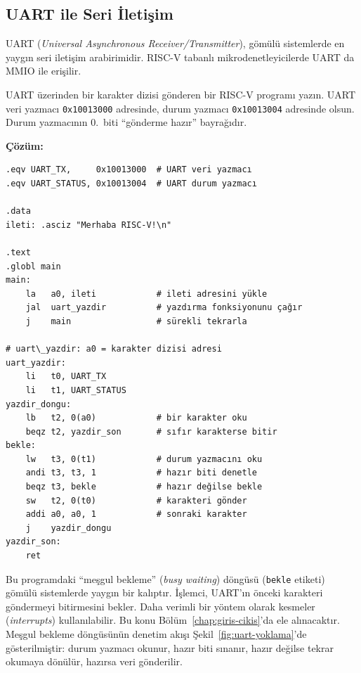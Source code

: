\subsection{UART ile Seri İletişim}
\label{subsec:uart}

UART (\emph{Universal Asynchronous Receiver/Transmitter}), gömülü sistemlerde en yaygın seri iletişim arabirimidir. RISC-V tabanlı mikrodenetleyicilerde UART da MMIO ile erişilir.

\begin{ornek}[4.19]
\label{orn:uart}
UART üzerinden bir karakter dizisi gönderen bir RISC-V programı yazın. UART veri yazmacı \texttt{0x10013000} adresinde, durum yazmacı \texttt{0x10013004} adresinde olsun. Durum yazmacının 0.\ biti ``gönderme hazır'' bayrağıdır.

\textbf{Çözüm:}

\begin{lstlisting}[style=riscv]
.eqv UART_TX,     0x10013000  # UART veri yazmacı
.eqv UART_STATUS, 0x10013004  # UART durum yazmacı

.data
ileti: .asciz "Merhaba RISC-V!\n"

.text
.globl main
main:
    la   a0, ileti            # ileti adresini yükle
    jal  uart_yazdir          # yazdırma fonksiyonunu çağır
    j    main                 # sürekli tekrarla

# uart\_yazdir: a0 = karakter dizisi adresi
uart_yazdir:
    li   t0, UART_TX
    li   t1, UART_STATUS
yazdir_dongu:
    lb   t2, 0(a0)            # bir karakter oku
    beqz t2, yazdir_son       # sıfır karakterse bitir
bekle:
    lw   t3, 0(t1)            # durum yazmacını oku
    andi t3, t3, 1            # hazır biti denetle
    beqz t3, bekle            # hazır değilse bekle
    sw   t2, 0(t0)            # karakteri gönder
    addi a0, a0, 1            # sonraki karakter
    j    yazdir_dongu
yazdir_son:
    ret
\end{lstlisting}

Bu programdaki ``meşgul bekleme'' (\emph{busy waiting}) döngüsü (\texttt{bekle} etiketi) gömülü sistemlerde yaygın bir kalıptır. İşlemci, UART'ın önceki karakteri göndermeyi bitirmesini bekler. Daha verimli bir yöntem olarak kesmeler (\emph{interrupts}) kullanılabilir. Bu konu Bölüm~\ref{chap:giris-cikis}'da ele alınacaktır. Meşgul bekleme döngüsünün denetim akışı Şekil~\ref{fig:uart-yoklama}'de gösterilmiştir: durum yazmacı okunur, hazır biti sınanır, hazır değilse tekrar okumaya dönülür, hazırsa veri gönderilir.
\end{ornek}


